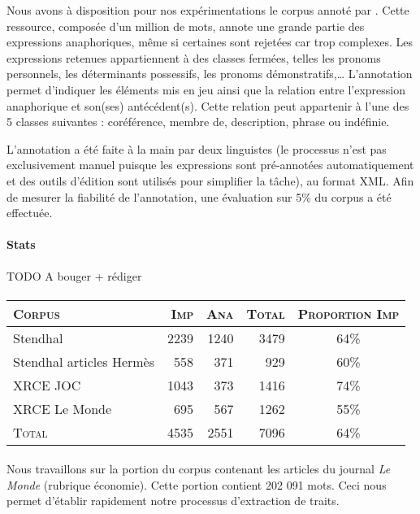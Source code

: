 \documentclass[a4paper,12pt]{article}
\begin{document}
\color{gray}

Nous avons à disposition pour nos expérimentations le corpus annoté par \citet{tutin-hal-00373327}.
Cette ressource, composée d'un million de mots, annote une grande partie des expressions anaphoriques, même si certaines sont rejetées car trop complexes. Les expressions retenues appartiennent à des classes fermées, telles les pronoms personnels, les déterminants possessifs, les pronoms démonstratifs,\ldots
L'annotation permet d'indiquer les éléments mis en jeu ainsi que la relation entre l'expression anaphorique et son(ses) antécédent(s). Cette relation peut appartenir à l'une des 5 classes suivantes : coréférence, membre de, description, phrase ou indéfinie.

L'annotation a été faite à la main par deux linguistes (le processus n'est pas exclusivement manuel puisque les expressions sont pré-annotées automatiquement et des outils d'édition sont utilisés pour simplifier la tâche), au format XML. Afin de mesurer la fiabilité de l'annotation, une évaluation sur 5\% du corpus a été effectuée.

\color{black}

\paragraph{Stats}
TODO A bouger + rédiger

\paragraph*{}
\begin{tabular}{|l|r|r|r|c|}
   \hline
   \textsc{Corpus} & \textsc{Imp} & \textsc{Ana} & \textsc{Total} & \textsc{Proportion Imp}\\
   \hline
   Stendhal & 2239 & 1240 & 3479 & 64\%\\
   Stendhal articles Hermès & 558 & 371 & 929 & 60\%\\
   XRCE JOC & 1043 & 373 & 1416 & 74\%\\
   XRCE Le Monde & 695 & 567 & 1262 & 55\%\\
   \hline
   \textsc{Total} & 4535 & 2551 & 7096 & 64\%\\
   \hline
\end{tabular}

\color{gray}

\paragraph{}
Nous travaillons sur la portion du corpus contenant les articles du journal \emph{Le Monde} (rubrique économie). Cette portion contient 202 091 mots. Ceci nous permet d'établir rapidement notre processus d'extraction de traits.
\end{document}
